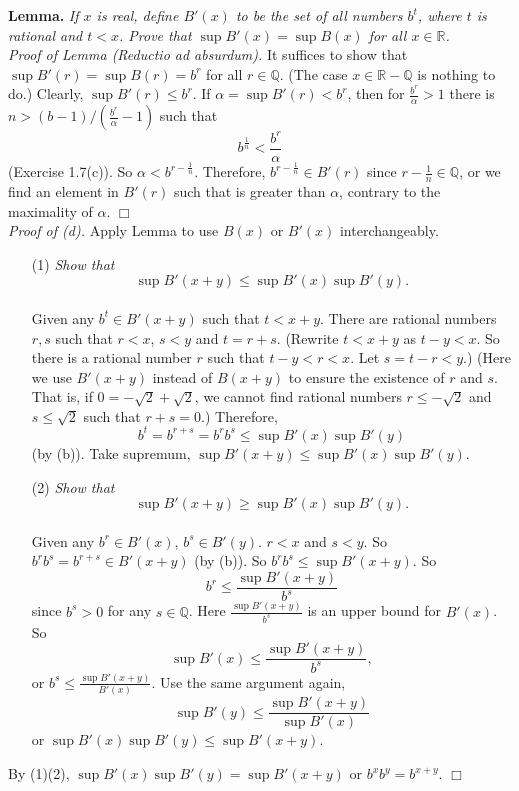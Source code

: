 \documentclass{article}
\begin{document}
\textbf{Lemma.}
\emph{If $x$ is real, define $B'(x)$ to be the set of all numbers $b^t$,
where $t$ is rational and $t < x$.
Prove that $\sup B'(x) = \sup B(x)$ for all $x \in \mathbb{R}$.} \\

\emph{Proof of Lemma (Reductio ad absurdum).}
It suffices to show that $\sup B'(r) = \sup B(r) = b^r$ for all $r \in \mathbb{Q}$.
(The case $x \in \mathbb{R}-\mathbb{Q}$ is nothing to do.)
Clearly, $\sup B'(r) \leq b^r$.
If $\alpha = \sup B'(r) < b^r$, then for $\frac{b^r}{\alpha} > 1$ there is
$n > (b-1)/\left(\frac{b^r}{\alpha} - 1\right)$ such that
$$b^{\frac{1}{n}} < \frac{b^r}{\alpha}$$
(Exercise 1.7(c)).
So
$\alpha < b^{r - \frac{1}{n}}$.
Therefore, $b^{r - \frac{1}{n}} \in B'(r)$ since $r - \frac{1}{n} \in \mathbb{Q}$,
or we find an element in $B'(r)$ such that is greater than $\alpha$,
contrary to the maximality of $\alpha$.
$\Box$ \\

\emph{Proof of (d).}
Apply Lemma to use $B(x)$ or $B'(x)$ interchangeably.
\begin{enumerate}
\item[(1)]
\emph{Show that $$\sup B'(x+y) \leq \sup B'(x)\sup B'(y).$$ } \\
Given any $b^t \in B'(x+y)$ such that $t < x+y$.
There are rational numbers $r, s$ such that $r < x$, $s < y$ and $t=r+s$.
(Rewrite $t < x+y$ as $t-y < x$. So there is a rational number $r$ such that $t-y < r < x$.
Let $s = t-r < y$.)
(Here we use $B'(x+y)$ instead of $B(x+y)$ to ensure the existence of $r$ and $s$.
That is, if $0 = -\sqrt{2} + \sqrt{2}$, we cannot find rational numbers
$r \leq -\sqrt{2}$ and $s \leq \sqrt{2}$ such that $r + s = 0$.)
Therefore,
$$b^t = b^{r+s} = b^r b^s \leq \sup B'(x) \sup B'(y)$$
(by (b)). Take supremum, $\sup B'(x+y) \leq \sup B'(x) \sup B'(y)$.
\item[(2)]
\emph{Show that $$\sup B'(x+y) \geq \sup B'(x)\sup B'(y).$$ } \\
Given any $b^r \in B'(x)$, $b^s \in B'(y)$. $r < x$ and $s < y$.
So $b^r b^s = b^{r+s} \in B'(x+y)$ (by (b)).
So $b^r b^s \leq \sup B'(x+y)$.
So
$$b^r \leq \frac{\sup B'(x+y)}{b^s}$$
since $b^s > 0$ for any $s \in \mathbb{Q}$.
Here $\frac{\sup B'(x+y)}{b^s}$ is an upper bound for $B'(x)$.
So
$$\sup B'(x) \leq \frac{\sup B'(x+y)}{b^s},$$
or $b^s \leq \frac{\sup B'(x+y)}{B'(x)}$.
Use the same argument again,
$$\sup B'(y) \leq \frac{\sup B'(x+y)}{\sup B'(x)}$$
or $\sup B'(x) \sup B'(y) \leq \sup B'(x+y)$.
\end{enumerate}
By (1)(2), $\sup B'(x) \sup B'(y) = \sup B'(x+y)$ or $b^x b^y = b^{x+y}$.
$\Box$ \\\\
\end{document}
